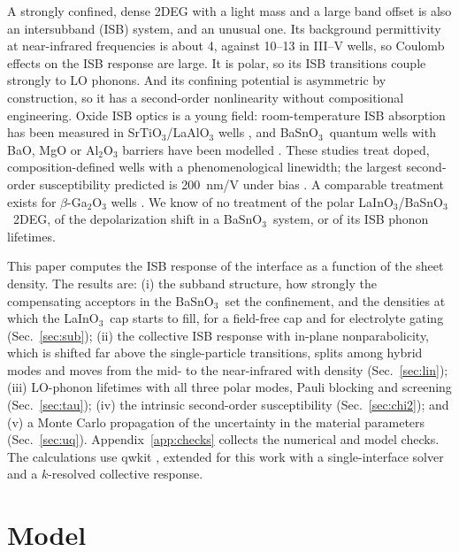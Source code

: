 \documentclass[11pt]{article}
\newcommand{\LIO}{\texorpdfstring{LaInO$_3$}{LaInO3}}
\newcommand{\BSO}{\texorpdfstring{BaSnO$_3$}{BaSnO3}}
\begin{document}
A strongly confined, dense 2DEG with a light mass and a large band offset is also an intersubband (ISB) system, and an unusual one. Its background permittivity at near-infrared frequencies is about 4, against 10--13 in III--V wells, so Coulomb effects on the ISB response are large. It is polar, so its ISB transitions couple strongly to LO phonons. And its confining potential is asymmetric by construction, so it has a second-order nonlinearity without compositional engineering. Oxide ISB optics is a young field: room-temperature ISB absorption has been measured in SrTiO$_3$/LaAlO$_3$ wells \cite{Ortmann2018}, and \BSO\ quantum wells with BaO, MgO or Al$_2$O$_3$ barriers have been modelled \cite{Li2021BSO,Stanojevic2023,Jang2023}. These studies treat doped, composition-defined wells with a phenomenological linewidth; the largest second-order susceptibility predicted is 200~nm/V under bias \cite{Li2021BSO}. A comparable treatment exists for $\beta$-Ga$_2$O$_3$ wells \cite{Lyman2020}. We know of no treatment of the polar \LIO/\BSO\ 2DEG, of the depolarization shift in a \BSO\ system, or of its ISB phonon lifetimes.

This paper computes the ISB response of the interface as a function of the sheet density. The results are: (i) the subband structure, how strongly the compensating acceptors in the \BSO\ set the confinement, and the densities at which the \LIO\ cap starts to fill, for a field-free cap and for electrolyte gating (Sec.~\ref{sec:sub}); (ii) the collective ISB response with in-plane nonparabolicity, which is shifted far above the single-particle transitions, splits among hybrid modes and moves from the mid- to the near-infrared with density (Sec.~\ref{sec:lin}); (iii) LO-phonon lifetimes with all three polar modes, Pauli blocking and screening (Sec.~\ref{sec:tau}); (iv) the intrinsic second-order susceptibility (Sec.~\ref{sec:chi2}); and (v) a Monte Carlo propagation of the uncertainty in the material parameters (Sec.~\ref{sec:uq}). Appendix~\ref{app:checks} collects the numerical and model checks. The calculations use qwkit \cite{qwkit}, extended for this work with a single-interface solver and a $k$-resolved collective response.

\section{Model}\label{sec:model}
\end{document}
